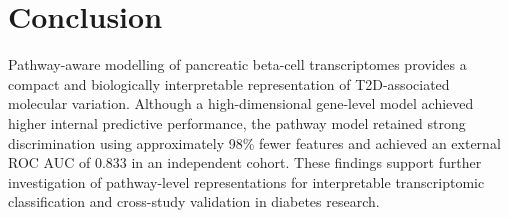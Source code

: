 \documentclass[conference]{IEEEtran}
\begin{document}
\section{Conclusion}

Pathway-aware modelling of pancreatic beta-cell transcriptomes provides a compact and biologically interpretable representation of T2D-associated molecular variation. Although a high-dimensional gene-level model achieved higher internal predictive performance, the pathway model retained strong discrimination using approximately 98\% fewer features and achieved an external ROC AUC of 0.833 in an independent cohort. These findings support further investigation of pathway-level representations for interpretable transcriptomic classification and cross-study validation in diabetes research.



\end{document}
